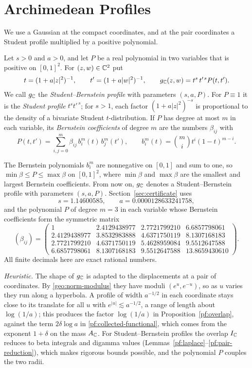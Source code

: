 \section{Archimedean Profiles}
\label{pf:section}

We use a Gaussian at the compact coordinates, and at the pair
coordinates a Student profile multiplied by a positive polynomial.

\begin{definition}\label{pf:student}
Let $s>0$ and $a>0$, and let $P$ be a real polynomial in two variables
that is positive on $[0,1]^2$. For $(z,w)\in\mathbb C^2$ put
\[
 t=(1+a|z|^2)^{-1},\qquad t'=(1+a|w|^2)^{-1},\qquad
 g_\mathbb C(z,w)=t^s\,t'^{\,s}P(t,t').
\]
We call $g_\mathbb C$ the \emph{Student--Bernstein profile} with parameters
$(s,a,P)$. For $P\equiv1$ it is the \emph{Student profile}
$t^st'^{\,s}$; for $s>1$, each factor $(1+a|z|^2)^{-s}$ is proportional
to the density of a bivariate Student $t$-distribution. If $P$ has
degree at most $m$ in each variable, its \emph{Bernstein coefficients}
of degree $m$ are the numbers $\beta_{ij}$ with
\[
 P(t,t')=\sum_{i,j=0}^m\beta_{ij}\,b_i^m(t)\,b_j^m(t'),\qquad
 b_i^m(t)=\binom mi t^i(1-t)^{m-i}.
\]
\end{definition}

The Bernstein polynomials $b_i^m$ are nonnegative on $[0,1]$ and sum to
one, so $\min\beta\le P\le\max\beta$ on $[0,1]^2$, where $\min\beta$ and
$\max\beta$ are the smallest and largest Bernstein coefficients. From
now on, $g_\mathbb C$ denotes a Student--Bernstein profile with parameters
$(s,a,P)$. Section~\ref{sec:certificate} uses
\[
 s=1.14600585,\qquad a=0.0000128633241758,
\]
and the polynomial $P$ of degree $m=3$ in each variable whose Bernstein
coefficients form the symmetric matrix
\begin{equation}\label{pf:bernstein-witness}
 (\beta_{ij})=\begin{pmatrix}
 1&2.4129438977&2.7721799210&6.6857798061\\
 2.4129438977&3.8532983888&4.6371750119&8.1307168183\\
 2.7721799210&4.6371750119&5.4628959084&9.5512647588\\
 6.6857798061&8.1307168183&9.5512647588&13.8659430610
 \end{pmatrix}.
\end{equation}
All finite decimals here are exact rational numbers.

\emph{Heuristic.} The shape of $g_\mathbb C$ is adapted to the displacements
at a pair of coordinates. By \eqref{geo:norm-modulus} they have moduli
$(e^u,e^{-u})$, so as $u$ varies they run along a hyperbola. A profile
of width $a^{-1/2}$ in each coordinate stays close to its translate for
all $u$ with $e^{|u|}\lesssim a^{-1/2}$, a range of length about
$\log(1/a)$; this produces the factor $\log(1/a)$ in
Proposition~\ref{pf:overlap}, against the term $2\delta\log a$ in
\eqref{pf:collected-functional}, which comes from the exponent
$1+\delta$ on the mass $A_\mathbb C$. For Student--Bernstein profiles the
overlap $I_\mathbb C$ reduces to beta integrals and digamma values
(Lemmas~\ref{pf:laplace}--\ref{pf:pair-reduction}), which makes rigorous
bounds possible, and the polynomial $P$ couples the two radii.

